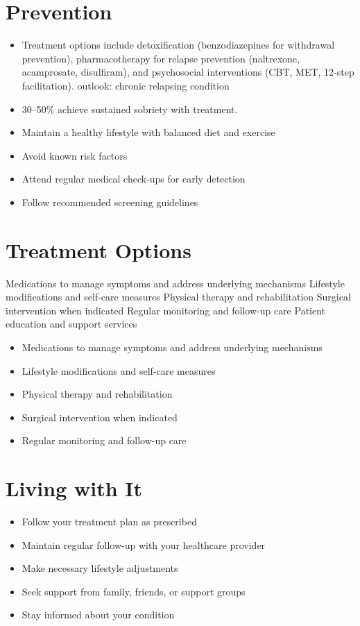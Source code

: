 \section{Prevention}
\begin{itemize}[noitemsep]
  \item Treatment options include detoxification (benzodiazepines for withdrawal prevention), pharmacotherapy for relapse prevention (naltrexone, acamprosate, disulfiram), and psychosocial interventions (CBT, MET, 12-step facilitation). outlook: chronic relapsing condition
  \item 30--50\% achieve sustained sobriety with treatment.
  \item Maintain a healthy lifestyle with balanced diet and exercise
  \item Avoid known risk factors
  \item Attend regular medical check-ups for early detection
  \item Follow recommended screening guidelines
\end{itemize}
\section{Treatment Options}
Medications to manage symptoms and address underlying mechanisms Lifestyle modifications and self-care measures Physical therapy and rehabilitation Surgical intervention when indicated Regular monitoring and follow-up care Patient education and support services

\begin{itemize}[noitemsep]
  \item Medications to manage symptoms and address underlying mechanisms
  \item Lifestyle modifications and self-care measures
  \item Physical therapy and rehabilitation
  \item Surgical intervention when indicated
  \item Regular monitoring and follow-up care
\end{itemize}
\section{Living with It}
\begin{itemize}[noitemsep]
  \item Follow your treatment plan as prescribed
  \item Maintain regular follow-up with your healthcare provider
  \item Make necessary lifestyle adjustments
  \item Seek support from family, friends, or support groups
  \item Stay informed about your condition
\end{itemize}

